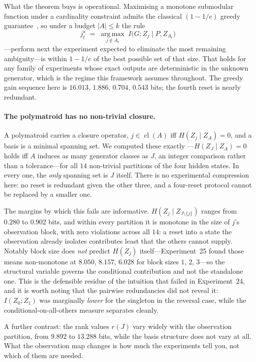\documentclass[11pt]{article}
\begin{document}
What the theorem buys is operational. Maximising a monotone submodular function under a
cardinality constraint admits the classical $(1 - 1/e)$ greedy
guarantee~\cite{nemhauser1978}, so under a budget $|A| \le k$ the rule
\[
  j^\star_t \;=\; \operatorname*{arg\,max}_{j \notin A_t}\; I\big(G; Z_j \mid P, Z_{A_t}\big)
\]
---perform next the experiment expected to eliminate the most remaining ambiguity---is
within $1 - 1/e$ of the best possible set of that size. That holds for any family of
experiments whose exact outputs are deterministic in the unknown generator, which is the
regime this framework assumes throughout. The greedy gain sequence here is $16.013$,
$1.886$, $0.704$, $0.543$ bits; the fourth reset is nearly redundant.

\paragraph{The polymatroid has no non-trivial closure.}
A polymatroid carries a closure operator, $j \in \operatorname{cl}(A)$ iff
$H(Z_j \mid Z_A) = 0$, and a basis is a minimal spanning set. We computed these exactly
---$H(Z_J \mid Z_A) = 0$ holds iff $A$ induces as many generator classes as $J$, an
integer comparison rather than a tolerance---for all $14$ non-trivial partitions of the
four hidden states. In every one, the \emph{only} spanning set is $J$ itself. There is no
experimental compression here: no reset is redundant given the other three, and a
four-reset protocol cannot be replaced by a smaller one.

The margins by which this fails are informative. $H(Z_j \mid Z_{J \setminus \{j\}})$ ranges
from $0.280$ to $0.902$ bits, and within every partition it is monotone in the size of
$j$'s observation block, with zero violations across all $14$: a reset into a state the
observation already isolates contributes least that the others cannot supply. Notably
block size does \emph{not} predict $H(Z_j)$ itself---Experiment~25 found those means
non-monotone at $8.050$, $8.157$, $6.028$ for block sizes $1$, $2$, $3$---so the structural
variable governs the conditional contribution and not the standalone one. This is the
defensible residue of the intuition that failed in Experiment~24, and it is worth noting
that the pairwise redundancies did not reveal it: $I(Z_0;Z_1)$ was marginally
\emph{lower} for the singleton in the reversal case, while the conditional-on-all-others
measure separates cleanly.

A further contrast: the rank values $r(J)$ vary widely with the observation partition,
from $9.892$ to $13.288$ bits, while the basis structure does not vary at all. What the
observation map changes is how much the experiments tell you, not which of them are
needed.
\end{document}
